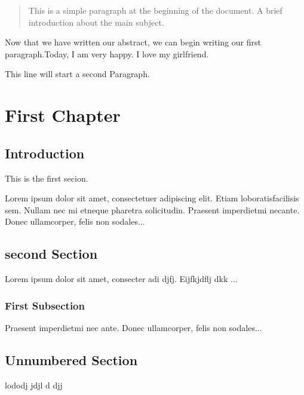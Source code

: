 \documentclass{report}
\begin{document}
\begin{abstract}
This is a simple paragraph at the beginning of the document.
A brief introduction about the main subject.
\end{abstract}

Now that we have written our abstract, we can begin writing our first paragraph.Today, I am very happy. I love my girlfriend.

This line will start a second Paragraph.

\chapter{First Chapter}

\section{Introduction}

This is the first secion.

Lorem ipsum dolor sit amet, consectetuer adipiscing elit. Etiam loboratisfacilisis sem. Nullam nec mi etneque pharetra solicitudin. Praesent imperdietmi necante.
Donec ullamcorper, felis non sodales...

\section{second Section}

Lorem ipsum dolor sit amet, consecter adi  djfj. Eijfkjdflj dkk
...

\subsection{First Subsection}
Praesent imperdietmi nec ante. Donec ullamcorper, felis non sodales...
\section*{Unnumbered Section}
lododj  jdjl  d djj
\end{document}
